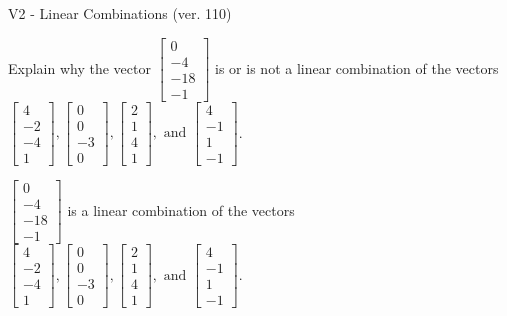 \begin{exercise}
  \begin{exerciseTitle}V2 - Linear Combinations (ver. 110)\end{exerciseTitle}
  \begin{exerciseStatement}
    Explain why the vector \(\left[\begin{array}{c}
0 \\
-4 \\
-18 \\
-1
\end{array}\right]\)  is or is not a linear 
	combination of the vectors \(\left[\begin{array}{c}
4 \\
-2 \\
-4 \\
1
\end{array}\right] , \left[\begin{array}{c}
0 \\
0 \\
-3 \\
0
\end{array}\right] , \left[\begin{array}{c}
2 \\
1 \\
4 \\
1
\end{array}\right] , \text{ and } \left[\begin{array}{c}
4 \\
-1 \\
1 \\
-1
\end{array}\right]\).
	


  \end{exerciseStatement}
  \begin{exerciseAnswer}
   \(\left[\begin{array}{c}
0 \\
-4 \\
-18 \\
-1
\end{array}\right]\) 
  	 is  
	a linear combination of the vectors \(\left[\begin{array}{c}
4 \\
-2 \\
-4 \\
1
\end{array}\right] , \left[\begin{array}{c}
0 \\
0 \\
-3 \\
0
\end{array}\right] , \left[\begin{array}{c}
2 \\
1 \\
4 \\
1
\end{array}\right] , \text{ and } \left[\begin{array}{c}
4 \\
-1 \\
1 \\
-1
\end{array}\right]\).


\end{exerciseAnswer}
\end{exercise}
